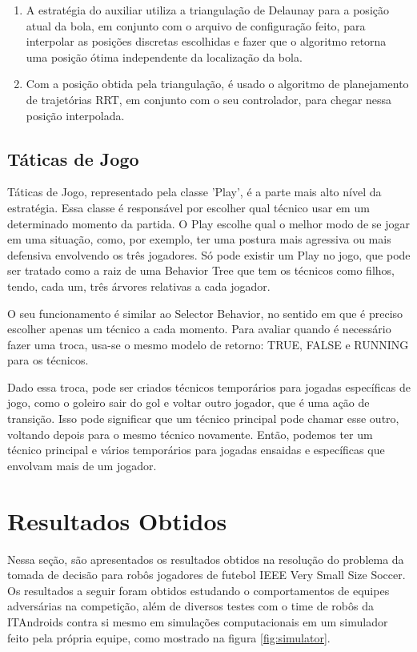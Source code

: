 \documentclass[a4paper,12pt]{article}
\begin{document}
\begin{enumerate}
\item A estratégia do auxiliar utiliza a triangulação de Delaunay para a posição atual da bola, em conjunto com o arquivo de configuração feito, para interpolar as posições discretas escolhidas e fazer que o algoritmo retorna uma posição ótima independente da localização da bola.

\item Com a posição obtida pela triangulação, é usado o algoritmo de planejamento de trajetórias RRT, em conjunto com o seu controlador, para chegar nessa posição interpolada.

\end{enumerate}

\subsection{Táticas de Jogo}

Táticas de Jogo, representado pela classe 'Play', é a parte mais alto nível da estratégia. Essa classe é responsável por escolher qual técnico usar em um determinado momento da partida. O Play escolhe qual o melhor modo de se jogar em uma situação, como, por exemplo, ter uma postura mais agressiva ou mais defensiva envolvendo os três jogadores. Só pode existir um Play no jogo, que pode ser tratado como a raiz de uma Behavior Tree que tem os técnicos como filhos, tendo, cada um, três árvores relativas a cada jogador.

O seu funcionamento é similar ao Selector Behavior, no sentido em que é preciso escolher apenas um técnico a cada momento. Para avaliar quando é necessário fazer uma troca, usa-se o mesmo modelo de retorno: TRUE, FALSE e RUNNING para os técnicos. 

Dado essa troca, pode ser criados técnicos temporários para jogadas específicas de jogo, como o goleiro sair do gol e voltar outro jogador, que é uma ação de transição. Isso pode significar que um técnico principal pode chamar esse outro, voltando depois para o mesmo técnico novamente. Então, podemos ter um técnico principal e vários temporários para jogadas ensaidas e específicas que envolvam mais de um jogador.


\section{Resultados Obtidos}
	\label{secao: resultados_obtidos}
    
Nessa seção, são apresentados os resultados obtidos na resolução do problema da tomada de decisão para robôs jogadores de futebol IEEE Very Small Size Soccer. Os resultados a seguir foram obtidos estudando o comportamentos de equipes adversárias na competição, além de diversos testes com o time de robôs da ITAndroids contra si mesmo em simulações computacionais em um simulador feito pela própria equipe, como mostrado na figura \ref{fig:simulator}.
\end{document}
